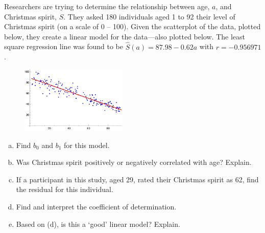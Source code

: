 \documentclass[12pt,letterpaper]{exam}
\begin{document}
\begin{questions}
\newpage
\question[10] Researchers are trying to determine the relationship between age, $a$, and Christmas spirit, $S$. They asked 180 individuals aged 1 to 92 their level of Christmas spirit (on a scale of 0 -- 100). Given the scatterplot of the data, plotted below, they create a linear model for the data---also plotted below. The least square regression line was found to be $\widehat{S}(a)= 87.98 - 0.62a$ with $r= -0.956971$. \par
	\begin{figure}[h]
	\centering
	\includegraphics[width=0.45\textwidth]{xmas_spirit.png}
	\end{figure}

\begin{enumerate}[(a)]
\item Find $b_0$ and $b_1$ for this model. 
\item Was Christmas spirit positively or negatively correlated with age? Explain.
\item If a participant in this study, aged 29, rated their Christmas spirit as 62, find the residual for this individual. 
\item Find and interpret the coefficient of determination. 
\item Based on (d), is this a `good' linear model? Explain. 
\end{enumerate}
	

\end{questions}
\end{document}
